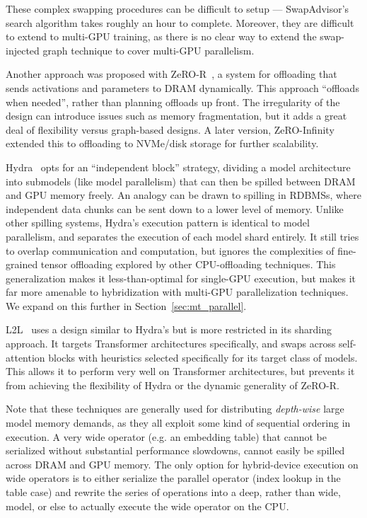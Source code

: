 These complex swapping procedures can be difficult to setup --- SwapAdvisor's search algorithm takes roughly an hour to complete. Moreover, they are difficult to extend to multi-GPU training, as there is no clear way to extend the swap-injected graph technique to cover multi-GPU parallelism.

Another approach was proposed with ZeRO-R~\cite{zero2019}, a system for offloading that sends activations and parameters to DRAM dynamically. This approach ``offloads when needed'', rather than planning offloads up front. The irregularity of the design can introduce issues such as memory fragmentation, but it adds a great deal of flexibility versus graph-based designs. A later version, ZeRO-Infinity~\cite{zero2021} extended this to offloading to NVMe/disk storage for further scalability.

Hydra~\cite{hydra2021} opts for an ``independent block'' strategy, dividing a model architecture into submodels (like model parallelism) that can then be spilled between DRAM and GPU memory freely. An analogy can be drawn to spilling in RDBMSs, where independent data chunks can be sent down to a lower level of memory. Unlike other spilling systems, Hydra's execution pattern is identical to model parallelism, and separates the execution of each model shard entirely. It still tries to overlap communication and computation, but ignores the complexities of fine-grained tensor offloading explored by other CPU-offloading techniques. This generalization makes it less-than-optimal for single-GPU execution, but makes it far more amenable to hybridization with multi-GPU parallelization techniques. We expand on this further in Section~\ref{sec:mt_parallel}.

L2L~\cite{l2l2020} uses a design similar to Hydra's but is more restricted in its sharding approach. It targets Transformer architectures specifically, and swaps across self-attention blocks with heuristics selected specifically for its target class of models. This allows it to perform very well on Transformer architectures, but prevents it from achieving the flexibility of Hydra or the dynamic generality of ZeRO-R.

Note that these techniques are generally used for distributing \textit{depth-wise} large model memory demands, as they all exploit some kind of sequential ordering in execution. A very wide operator (e.g. an embedding table) that cannot be serialized without substantial performance slowdowns, cannot easily be spilled across DRAM and GPU memory. The only option for hybrid-device execution on wide operators is to either serialize the parallel operator (index lookup in the table case) and rewrite the series of operations into a deep, rather than wide, model, or else to actually execute the wide operator on the CPU. 

